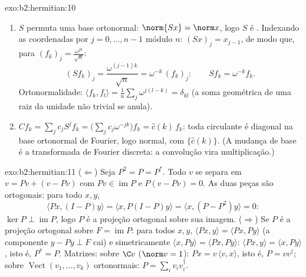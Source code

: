 \begin{solution}{exo:b2:hermitian:10}
\begin{enumerate}
  \item $S$ permuta uma base ortonormal: $\norm{Sx} = \norm
        x$, logo $S$ é . Indexando as coordenadas por $j = 0,
        \dots, n-1$ módulo $n$: $(Sx)_j = x_{j-1}$, de modo que, para
        $(f_k)_j = \frac{\omega^{jk}}{\sqrt n}$:
        \[
        (Sf_k)_j = \frac{\omega^{(j-1)k}}{\sqrt n}
        = \omega^{-k}\,(f_k)_j :
        \qquad Sf_k = \omega^{-k}f_k .
        \]
        Ortonormalidade: $\langle f_k, f_l\rangle = \frac1n
        \sum_j \omega^{j(l-k)} = \delta_{kl}$ (a soma geométrica
        de uma raiz da unidade não trivial se anula).
  \item $Cf_k = \sum_j c_j S^jf_k = \bigl(\sum_j
        c_j\omega^{-jk}\bigr)f_k = \widehat c(k)\,f_k$: toda
        circulante é diagonal na base ortonormal de Fourier,
        logo normal, com  $\{\widehat c(k)\}$. (A
        mudança de base é a transformada de Fourier discreta:
        a convolução vira multiplicação.)
\end{enumerate}
\end{solution}

\begin{solution}{exo:b2:hermitian:11}
($\Leftarrow$) Seja $P^2 = P = P^*$. Todo $v$ se separa em $v = Pv
+ (v - Pv)$ com $Pv \in \operatorname{im} P$ e $P(v - Pv) =
0$. As duas peças são ortogonais: para todo $x, y$,
\[
\langle Px, (I - P)y\rangle = \langle x, P(I-P)y\rangle
= \langle x, (P - P^2)y\rangle = 0 :
\]
$\ker P \perp \operatorname{im} P$, logo $P$ é a projeção
ortogonal sobre sua imagem. ($\Rightarrow$) Se $P$ é a
projeção ortogonal sobre $F = \operatorname{im}P$: para todos
$x, y$, $\langle Px, y\rangle = \langle Px, Py\rangle$ (a
componente $y - Py \perp F$ cai) e simetricamente $\langle
x, Py\rangle = \langle Px, Py\rangle$: $\langle Px, y\rangle =
\langle x, Py\rangle$, isto é, $P^* = P$. Matrizes: sobre $\C v$
($\norm v = 1$): $Px = v\,\langle v, x\rangle$, isto é, $P =
vv^\dagger$; sobre $\operatorname{Vect}(v_1, \dots, v_k)$
ortonormais: $P = \sum_i v_iv_i^\dagger$.
\end{solution}

